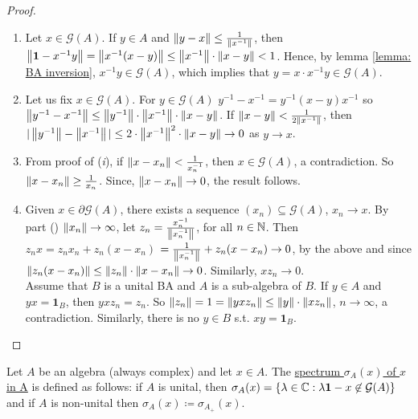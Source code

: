 \documentclass{article}
\begin{document}
\begin{proof}
    \begin{enumerate}[label = (\roman*), align = left]
        \item Let $x\in \mathcal{G}(A)$. If $y\in A$ and $\left\lVert y-x\right\rVert\leq \frac{1}{\left\lVert x^{-1}\right\rVert}$, then $\left\lVert\mathbf{1}-x^{-1}y\right\rVert=\left\lVert x^{-1}(x-y)\right\rVert\leq \left\lVert x^{-1}\right\rVert\cdot \left\lVert x-y\right\rVert<1$. Hence, by lemma \ref{lemma: BA inversion}, $x^{-1}y\in \mathcal{G}(A)$, which implies that $y=x\cdot x^{-1}y\in \mathcal{G}(A)$.
        \item Let us fix $x\in \mathcal{G}(A)$. For $y\in \mathcal{G}(A)$ $y^{-1}-x^{-1}=y^{-1}(x-y)x^{-1}$ so $\left\lVert y^{-1}-x^{-1}\right\rVert\leq \left\lVert y^{-1}\right\rVert\cdot \left\lVert x^{-1}\right\rVert\cdot\left\lVert x-y\right\rVert$. If $\left\lVert x-y\right\rVert<\frac{1}{2\left\lVert x^{-1}\right\rVert}$, then $|\left\lVert y^{-1}\right\rVert-\left\lVert x^{-1}\right\rVert|\leq 2\cdot \left\lVert x^{-1}\right\rVert^2\cdot \left\lVert x-y\right\rVert\to 0$ as $y\to x$.
        \item From proof of (\textit{i}), if $\left\lVert x-x_n\right\rVert<\frac{1}{x_n^{-1}}$, then $x\in \mathcal{G}(A)$, a contradiction. So $\left\lVert x-x_n\right\rVert\geq \frac{1}{x_n}$. Since, $\left\lVert x-x_n\right\rVert\to 0$, the result follows.
        \item Given $x\in \partial \mathcal{G}(A)$, there exists a sequence $(x_n)\subseteq\mathcal{G}(A)$, $x_n\to x$. By part () $\left\lVert x_n\right\rVert\to \infty$, let $z_n = \frac{x_n^{-1}}{\left\lVert x_n^{-1}\right\rVert}$, for all $n\in \mathbb{N}$. Then $z_nx = z_nx_n+z_n(x-x_n)$
        $=\frac{1}{\left\lVert x_n^{-1}\right\rVert}+z_n(x-x_n)\to 0$, by the above and since $\left\lVert z_n(x-x_n)\right\rVert\leq \left\lVert z_n\right\rVert\cdot \left\lVert x-x_n\right\rVert\to 0$. Similarly, $xz_n\to 0$.\\
        
        Assume that $B$ is a unital BA and $A$ is a sub-algebra of $B$. If $y\in A$ and $yx = \mathbf{1}_B$, then $yxz_n = z_n$. So $\left\lVert z_n\right\rVert=1=\left\lVert yxz_n\right\rVert\leq \left\lVert y\right\rVert\cdot\left\lVert xz_n\right\rVert$, $n\to\infty$, a contradiction. Similarly, there is no $y\in B$ s.t. $xy = \mathbf{1}_B$.
    \end{enumerate}
\end{proof}

\begin{boxdef}\label{def: spectrum}
     Let $A$ be an algebra (always complex) and let $x\in A$. The \noindent\underline{spectrum $\sigma_A(x)$ of $x$ in A} is defined as follows:
    if $A$ is unital, then $\sigma_A(x)= \{\lambda\in\mathbb{C}: \lambda\mathbf{1}-x\not\in\mathcal{G}(A)\}$ and if $A$ is non-unital then $\sigma_A(x) \coloneqq \sigma_{A_+}(x)$.
\end{boxdef}
\end{document}

